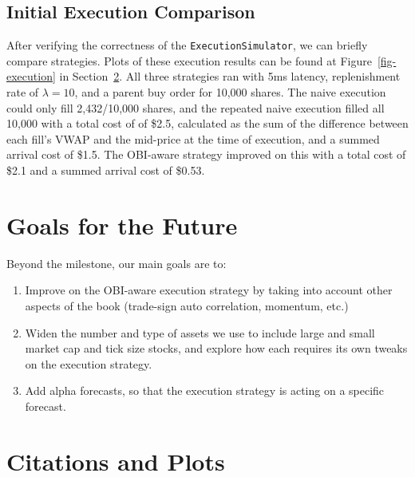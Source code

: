 \documentclass[
  letterpaper,
]{article}
\providecommand{\tightlist}{%
  \setlength{\itemsep}{0pt}\setlength{\parskip}{0pt}}
\begin{document}
\subsection{Initial Execution
Comparison}\label{initial-execution-comparison}

After verifying the correctness of the \texttt{ExecutionSimulator}, we
can briefly compare strategies. Plots of these execution results can be
found at Figure~\ref{fig-execution} in Section~\ref{sec-appendix}. All
three strategies ran with 5ms latency, replenishment rate of
\(\lambda = 10\), and a parent buy order for 10,000 shares. The naive
execution could only fill 2,432/10,000 shares, and the repeated naive
execution filled all 10,000 with a total cost of of \$2.5, calculated as
the sum of the difference between each fill's VWAP and the mid-price at
the time of execution, and a summed arrival cost of \$1.5. The OBI-aware
strategy improved on this with a total cost of \$2.1 and a summed
arrival cost of \$0.53.

\section{Goals for the Future}\label{goals-for-the-future}

Beyond the milestone, our main goals are to:

\begin{enumerate}
\def\labelenumi{\arabic{enumi}.}
\tightlist
\item
  Improve on the OBI-aware execution strategy by taking into account
  other aspects of the book (trade-sign auto correlation, momentum,
  etc.)
\item
  Widen the number and type of assets we use to include large and small
  market cap and tick size stocks, and explore how each requires its own
  tweaks on the execution strategy.
\item
  Add alpha forecasts, so that the execution strategy is acting on a
  specific forecast.
\end{enumerate}

\section{Citations and Plots}\label{sec-appendix}
\end{document}
